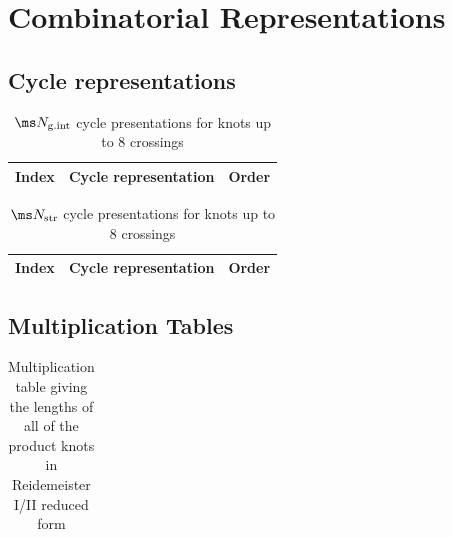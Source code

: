 \section{Combinatorial Representations}\label{app:combinatorial-representations}
\subsection{Cycle representations}
\begin{table}[H]
  \centering
  \small
  \begin{tabular}{clc}
    \toprule
    Index & Cycle representation & Order \\ \midrule
    
    \bottomrule
  \end{tabular}
  \caption[Cycle presentations]{$\ms N_{\rm g.int}$ cycle
    presentations for knots up to $8$ crossings}
  \label{tab:cycle-gint}
\end{table}

\begin{table}[H]
  \centering
  \small
  \begin{tabular}{clc}
    \toprule
    Index & Cycle representation & Order \\ \midrule
    
    \bottomrule
  \end{tabular}
  \caption[Cycle presentations]{$\ms N_{\rm str}$ cycle
    presentations for knots up to $8$ crossings}
  \label{tab:cycle-str}
\end{table}

\subsection{Multiplication Tables}
\begin{landscape}
\begin{table}[H]
  \centering
  \tiny
  \setlength\tabcolsep{2.5pt} %
  \begin{tabular}{c|ccccccccccccccccccccccccccccccccccccc}
    \toprule
    
    \bottomrule
  \end{tabular}
  \caption[Multiplication Table]{Multiplication table giving the
    lengths of all of the product knots in Reidemeister I/II reduced
    form}
  \label{tab:mult-table}
\end{table}
\end{landscape}

